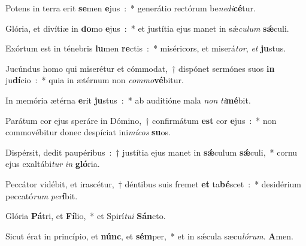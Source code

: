 ﻿\item Potens in terra erit \textbf{se}\-men \textbf{e}\-jus~:~* generátio rectórum be\emph{ne}\-\emph{di}\-\textbf{cé}\-tur.
\item Glória, et divítiæ in \textbf{do}\-mo \textbf{e}\-jus~:~* et justítia ejus manet in sǽ\emph{cu}\-\emph{lum} \textbf{sǽ}\-culi.
\item Exórtum est in ténebris \textbf{lu}\-men \textbf{re}\-ctis~:~* miséricors, et miserá\emph{tor}, \emph{et} \textbf{ju}\-stus.
\item Jucúndus homo qui miserétur et cómmodat,~† dispónet sermónes suos \textbf{in} ju\textbf{dí}\-cio~:~* quia in ætérnum non \emph{com}\-\emph{mo}\-\textbf{vé}\-bitur.
\item In memória ætérna \textbf{e}\-rit \textbf{ju}\-stus~:~* ab auditióne mala \emph{non} \emph{ti}\-\textbf{mé}\-bit.
\item Parátum cor ejus speráre in Dómino,~† confirmátum \textbf{est} cor \textbf{e}\-jus~:~* non commovébitur donec despíciat ini\emph{mí}\-\emph{cos} \textbf{su}\-os.
\item Dispérsit, dedit paupéribus~:~† justítia ejus manet in \textbf{sǽ}\-culum \textbf{sǽ}\-culi,~* cornu ejus exaltábi\emph{tur} \emph{in} \textbf{gló}\-ria.
\item Peccátor vidébit, et irascétur,~† déntibus suis fremet \textbf{et} ta\textbf{bé}\-scet~:~* desidérium peccató\emph{rum} \emph{per}\-\textbf{í}\-bit.
\item Glória \textbf{Pá}\-tri, et \textbf{Fí}\-lio,~* et Spirí\emph{tu}\-\emph{i} \textbf{Sán}\-cto.
\item Sicut érat in princípio, et \textbf{núnc}, et \textbf{sém}\-per,~* et in sǽcula sæcu\emph{ló}\-\emph{rum}. \textbf{A}\-men.